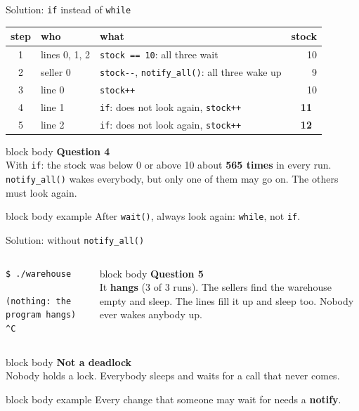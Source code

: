 \documentclass[aspectratio=169,10pt]{beamer}
\newcommand{\nok}{\textcolor{aWrite}{\faTimes}}
\newcommand{\stepbox}[2]{%
  \begin{beamercolorbox}[rounded=true,sep=0.09cm,wd=\linewidth]{block body}
    \footnotesize\textbf{#1}\\ #2
  \end{beamercolorbox}\vspace{0.06cm}}
\newcommand{\keymsg}[1]{%
  \begin{beamercolorbox}[rounded=true,sep=0.1cm,wd=\textwidth]{block body example}
    \centering\footnotesize #1
  \end{beamercolorbox}}
\begin{document}
\begin{frame}{Solution: \texttt{if} instead of \texttt{while}}
  \begin{center}
    \footnotesize
    \renewcommand{\arraystretch}{1.15}
    \begin{tabular}{c l l r}
      \toprule
      \textbf{step} & \textbf{who} & \textbf{what} & \textbf{stock} \\
      \midrule
      1 & lines 0, 1, 2 & \texttt{stock == 10}: all three wait & 10 \\
      2 & seller 0 & \texttt{stock-{}-}, \texttt{notify\_all()}: all three wake up & 9 \\
      3 & line 0 & \texttt{stock++} & 10 \\
      \rowcolor{AccentOrange!12}
      4 & line 1 & \texttt{if}: does not look again, \texttt{stock++} & \textbf{11}\ \nok \\
      \rowcolor{AccentOrange!12}
      5 & line 2 & \texttt{if}: does not look again, \texttt{stock++} & \textbf{12}\ \nok \\
      \bottomrule
    \end{tabular}
  \end{center}
  \vfill
  \stepbox{Question 4}{With \texttt{if}: the stock was below 0 or above 10 about \textbf{565 times} in every run.
    \texttt{notify\_all()} wakes everybody, but only one of them may go on. The others must look again.}
  \keymsg{After \texttt{wait()}, always look again: \texttt{while}, not \texttt{if}.}
\end{frame}

\begin{frame}[fragile]{Solution: without \texttt{notify\_all()}}
  \begin{columns}[T,onlytextwidth]
\begin{lstlisting}[style=term]
$ ./warehouse
        (nothing: the program hangs)
^C
\end{lstlisting}
      \stepbox{Question 5}{It \textbf{hangs} (3 of 3 runs). The sellers find the warehouse empty and sleep.
        The lines fill it up and sleep too. Nobody ever wakes anybody up.}
  \end{columns}
  \vfill
  \stepbox{Not a deadlock}{Nobody holds a lock. Everybody sleeps and waits for a call that never comes.}
  \keymsg{Every change that someone may wait for needs a \textbf{notify}.}
\end{frame}
\end{document}

